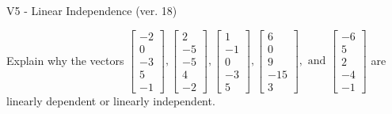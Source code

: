 \begin{exercise}
  \begin{exerciseTitle}V5 - Linear Independence (ver. 18)\end{exerciseTitle}
  \begin{exerciseStatement}
    Explain why the vectors \(\left[\begin{array}{r}
-2 \\
0 \\
-3 \\
5 \\
-1
\end{array}\right] , \left[\begin{array}{r}
2 \\
-5 \\
-5 \\
4 \\
-2
\end{array}\right] , \left[\begin{array}{r}
1 \\
-1 \\
0 \\
-3 \\
5
\end{array}\right] , \left[\begin{array}{r}
6 \\
0 \\
9 \\
-15 \\
3
\end{array}\right] , \text{ and } \left[\begin{array}{r}
-6 \\
5 \\
2 \\
-4 \\
-1
\end{array}\right]\) are linearly dependent or linearly independent.	



\end{exerciseStatement}
\end{exercise}
